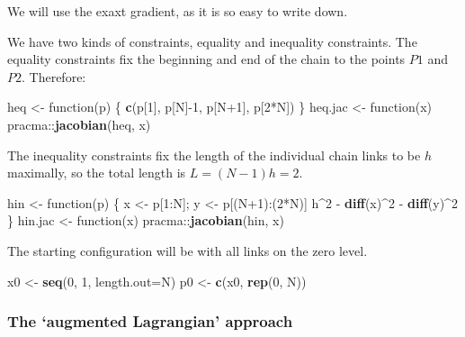 \documentclass[]{article}
\newenvironment{Shaded}{\begin{snugshade}}{\end{snugshade}}
\newcommand{\KeywordTok}[1]{\textcolor[rgb]{0.13,0.29,0.53}{\textbf{{#1}}}}
\newcommand{\DataTypeTok}[1]{\textcolor[rgb]{0.13,0.29,0.53}{{#1}}}
\newcommand{\DecValTok}[1]{\textcolor[rgb]{0.00,0.00,0.81}{{#1}}}
\newcommand{\StringTok}[1]{\textcolor[rgb]{0.31,0.60,0.02}{{#1}}}
\newcommand{\NormalTok}[1]{{#1}}
\begin{document}
We will use the exaxt gradient, as it is so easy to write down.

We have two kinds of constraints, equality and inequality constraints.
The equality constraints fix the beginning and end of the chain to the
points \(P1\) and \(P2\). Therefore:

\begin{Shaded}
\begin{Highlighting}[]
\NormalTok{heq <-}\StringTok{ }\NormalTok{function(p) \{}
    \KeywordTok{c}\NormalTok{(p[}\DecValTok{1}\NormalTok{], p[N]-}\DecValTok{1}\NormalTok{, p[N}\DecValTok{+1}\NormalTok{], p[}\DecValTok{2}\NormalTok{*N])}
\NormalTok{\}}
\NormalTok{heq.jac <-}\StringTok{ }\NormalTok{function(x) pracma::}\KeywordTok{jacobian}\NormalTok{(heq, x)}
\end{Highlighting}
\end{Shaded}

The inequality constraints fix the length of the individual chain links
to be \(h\) maximally, so the total length is \(L = (N-1) h = 2\).

\begin{Shaded}
\begin{Highlighting}[]
\NormalTok{hin <-}\StringTok{ }\NormalTok{function(p) \{}
    \NormalTok{x <-}\StringTok{ }\NormalTok{p[}\DecValTok{1}\NormalTok{:N]; y <-}\StringTok{ }\NormalTok{p[(N}\DecValTok{+1}\NormalTok{):(}\DecValTok{2}\NormalTok{*N)]}
    \NormalTok{h^}\DecValTok{2} \NormalTok{-}\StringTok{ }\KeywordTok{diff}\NormalTok{(x)^}\DecValTok{2} \NormalTok{-}\StringTok{ }\KeywordTok{diff}\NormalTok{(y)^}\DecValTok{2}
\NormalTok{\}}
\NormalTok{hin.jac <-}\StringTok{ }\NormalTok{function(x) pracma::}\KeywordTok{jacobian}\NormalTok{(hin, x)}
\end{Highlighting}
\end{Shaded}

The starting configuration will be with all links on the zero level.

\begin{Shaded}
\begin{Highlighting}[]
\NormalTok{x0 <-}\StringTok{ }\KeywordTok{seq}\NormalTok{(}\DecValTok{0}\NormalTok{, }\DecValTok{1}\NormalTok{, }\DataTypeTok{length.out=}\NormalTok{N)}
\NormalTok{p0 <-}\StringTok{ }\KeywordTok{c}\NormalTok{(x0, }\KeywordTok{rep}\NormalTok{(}\DecValTok{0}\NormalTok{, N))}
\end{Highlighting}
\end{Shaded}

\subsubsection{\texorpdfstring{The `augmented Lagrangian'
approach}{The augmented Lagrangian approach}}\label{the-augmented-lagrangian-approach}
\end{document}
